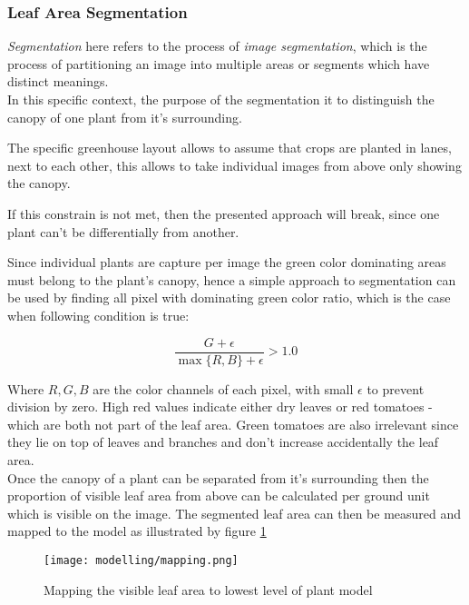 \subsubsection{Leaf Area Segmentation}\label{subsec:segmentation}


\textit{Segmentation} here refers to the process of \textit{image segmentation}, which is the process
of partitioning an image into multiple areas or segments which have distinct meanings.\\

In this specific context, the purpose of the segmentation it to distinguish the canopy of one plant
from it's surrounding.

The specific greenhouse layout allows to assume that crops are planted in lanes, next to each other, this
allows to take individual images from above only showing the canopy.

If this constrain is not met, then the presented approach will break, since one plant can't be
differentially from another.

Since individual plants are capture per image the green color dominating areas must belong to the
plant's canopy, hence a simple approach to segmentation can be used by finding all pixel with
dominating green color ratio, which is the case when following condition is true:

\[
    \frac{G + \epsilon}{\max{\{R, B\}} + \epsilon} > 1.0 
\]

Where $R, G, B$ are the color channels of each pixel, with small $\epsilon$ to prevent division by zero.
High red values indicate either dry leaves or red tomatoes - which are both not part of the leaf
area.
Green tomatoes are also irrelevant since they lie on top of leaves and branches and don't increase
accidentally the leaf area.\\

Once the canopy of a plant can be separated from it's surrounding then the proportion of visible leaf
area from above can be calculated per ground unit which is visible on the image.
The segmented leaf area can then be measured and mapped to the model as illustrated
by figure \ref{fig:mapping}

\begin{figure}[H]
    \texttt{[image: modelling/mapping.png]}
    \caption{Mapping the visible leaf area to lowest level of plant model}
    \label{fig:mapping}
\end{figure}

